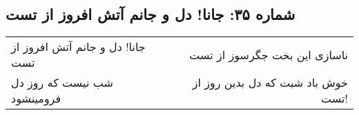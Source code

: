\begin{center}
\section*{شماره ۳۵: جانا! دل و جانم آتش افروز از تست}
\label{sec:035}
\begin{longtable}{l p{0.5cm} r}
جانا! دل و جانم آتش افروز از تست
&&
ناسازی این بخت جگرسوز از تست
\\
شب نیست که روز دل فرومینشود
&&
خوش باد شبت که دل بدین روز از تست!
\\
\end{longtable}
\end{center}
